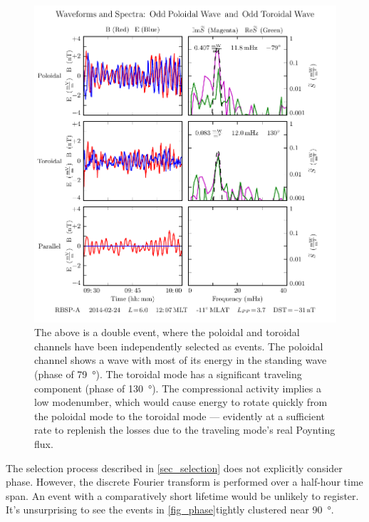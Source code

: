\begin{figure}[!htb]
    \centering
    \includegraphics[width=\textwidth]{figures/sample_event_phase.pdf}
    \caption[Waveforms and Spectra for a Pc4 Event]{
      The above is a double event, where the poloidal and toroidal channels have been independently selected as events. The poloidal channel shows a wave with most of its energy in the standing wave (phase of \SI{79}{\degree}). The toroidal mode has a significant traveling component (phase of \SI{130}{\degree}). The compressional activity implies a low modenumber, which would cause energy to rotate quickly from the poloidal mode to the toroidal mode --- evidently at a sufficient rate to replenish the losses due to the traveling mode's real Poynting flux. 
    }
    \label{fig_sample_event_phase}
\end{figure}

The selection process described in \cref{sec_selection} does not explicitly consider phase. However, the discrete Fourier transform is performed over a half-hour time span. An event with a comparatively short lifetime would be unlikely to register. It's unsurprising to see the events in \cref{fig_phase}tightly clustered near \SI{90}{\degree}. 

